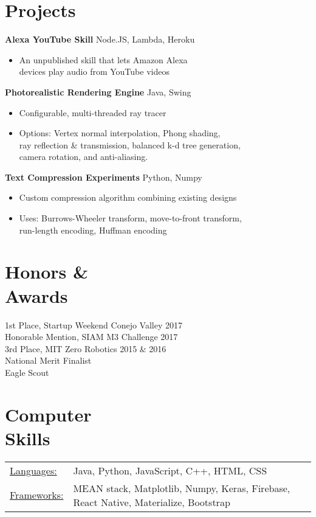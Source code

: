 \documentclass[margin]{res}
\begin{document}
\begin{resume}
\section{Projects} 
{\bf Alexa YouTube Skill} \hfill Node.JS, Lambda, Heroku
\begin{itemize} \itemsep -2pt
\item   An unpublished skill that lets Amazon Alexa \\ devices play audio from YouTube videos
\end{itemize}

{\bf Photorealistic Rendering Engine} \hfill Java, Swing
\begin{itemize} \itemsep -2pt
\item  Configurable, multi-threaded ray tracer
\item  Options: Vertex normal interpolation, Phong shading, \\
		ray reflection \& transmission, balanced k-d tree generation, \\
		camera rotation, and anti-aliasing.
\end{itemize}

{\bf Text Compression Experiments} \hfill Python, Numpy
\begin{itemize} \itemsep -2pt
\item  Custom compression algorithm combining existing designs
\item  Uses: Burrows-Wheeler transform, move-to-front transform, \\ 
		run-length encoding, Huffman encoding

\end{itemize}

\section{Honors \& \\ Awards} 
1st Place, Startup Weekend Conejo Valley 2017 \\
Honorable Mention, SIAM M3 Challenge 2017 \\
3rd Place, MIT Zero Robotics 2015 \& 2016 \\
National Merit Finalist \\
Eagle Scout

\section{Computer \\ Skills}
   \begin{tabular}{l p{3in}}
    \underline{Languages:} & Java, Python, JavaScript, C++, HTML, CSS \\

     \underline{Frameworks:} & MEAN stack, Matplotlib, Numpy, Keras, Firebase, React Native, Materialize, Bootstrap 
 \end{tabular}

\end{resume} 
\end{document}
